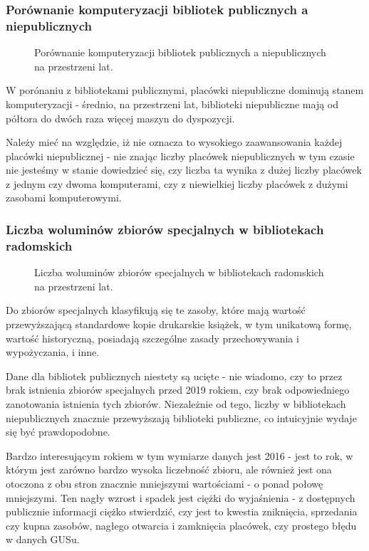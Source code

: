 \documentclass[12pt]{article}
\begin{document}
\subsubsection{Porównanie komputeryzacji bibliotek publicznych a niepublicznych}
\begin{figure}[H]
    
    \caption{Porównanie komputeryzacji bibliotek publicznych a niepublicznych na przestrzeni lat.}
\end{figure}

W porónaniu z bibliotekami publicznymi, placówki niepubliczne dominują stanem komputeryzacji - średnio, na przestrzeni lat, biblioteki niepubliczne mają od półtora do dwóch 
raza więcej maszyn do dyspozycji.

Należy mieć na względzie, iż nie oznacza to wysokiego zaawansowania każdej placówki niepublicznej - nie znając liczby placówek niepublicznych w tym czasie 
nie jesteśmy w stanie dowiedzieć się, czy liczba ta wynika z dużej liczby placówek z jednym czy dwoma komputerami, czy z niewielkiej liczby placówek z dużymi 
zasobami komputerowymi.

\subsubsection{Liczba woluminów zbiorów specjalnych w bibliotekach radomskich}
\begin{figure}[H]
    
    \caption{Liczba woluminów zbiorów specjalnych w bibliotekach radomskich na przestrzeni lat.}
\end{figure}

Do zbiorów specjalnych klasyfikują się te zasoby, które mają wartość przewyższającą standardowe kopie drukarskie książek, w tym unikatową formę, wartość historyczną, 
posiadają szczególne zasady przechowywania i wypożyczania, i inne.

Dane dla bibliotek publicznych niestety są ucięte - nie wiadomo, czy to przez brak istnienia zbiorów specjalnych przed 2019 rokiem, czy brak odpowiedniego zanotowania
istnienia tych zbiorów. Niezależnie od tego, liczby w bibliotekach niepublicznych znacznie przewyższają biblioteki publiczne, co intuicyjnie wydaje się być prawdopodobne.

Bardzo interesującym rokiem w tym wymiarze danych jest 2016 - jest to rok, w którym jest zarówno bardzo wysoka liczebność zbioru, ale również jest ona otoczona z obu stron 
znacznie mniejszymi wartościami - o ponad połowę mniejszymi. Ten nagły wzrost i spadek jest ciężki do wyjaśnienia - z dostępnych publicznie informacji ciężko stwierdzić, 
czy jest to kwestia zniknięcia, sprzedania czy kupna zasobów, nagłego otwarcia i zamknięcia placówek, czy prostego błędu w danych GUSu.   
\end{document}
